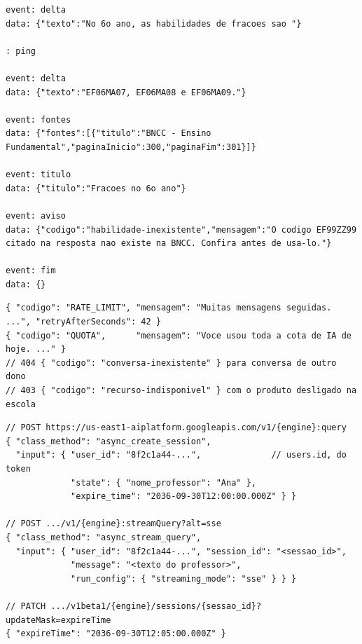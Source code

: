 \begin{lstlisting}[language=bashunoo, caption={A resposta: \cd{text/event-stream} (um turno com fonte, título e aviso)}]
event: delta
data: {"texto":"No 6o ano, as habilidades de fracoes sao "}

: ping

event: delta
data: {"texto":"EF06MA07, EF06MA08 e EF06MA09."}

event: fontes
data: {"fontes":[{"titulo":"BNCC - Ensino Fundamental","paginaInicio":300,"paginaFim":301}]}

event: titulo
data: {"titulo":"Fracoes no 6o ano"}

event: aviso
data: {"codigo":"habilidade-inexistente","mensagem":"O codigo EF99ZZ99 citado na resposta nao existe na BNCC. Confira antes de usa-lo."}

event: fim
data: {}
\end{lstlisting}

\begin{lstlisting}[language=jsonunoo, caption={Recusa ANTES do \emph{stream} --- 429 em JSON}]
{ "codigo": "RATE_LIMIT", "mensagem": "Muitas mensagens seguidas. ...", "retryAfterSeconds": 42 }
{ "codigo": "QUOTA",      "mensagem": "Voce usou toda a cota de IA de hoje. ..." }
// 404 { "codigo": "conversa-inexistente" } para conversa de outro dono
// 403 { "codigo": "recurso-indisponivel" } com o produto desligado na escola
\end{lstlisting}

\begin{lstlisting}[language=jsonunoo, caption={A api \seta{} o Agent Engine: \cd{:query} e \cd{:streamQuery?alt=sse}}]
// POST https://us-east1-aiplatform.googleapis.com/v1/{engine}:query
{ "class_method": "async_create_session",
  "input": { "user_id": "8f2c1a44-...",              // users.id, do token
             "state": { "nome_professor": "Ana" },
             "expire_time": "2036-09-30T12:00:00.000Z" } }

// POST .../v1/{engine}:streamQuery?alt=sse
{ "class_method": "async_stream_query",
  "input": { "user_id": "8f2c1a44-...", "session_id": "<sessao_id>",
             "message": "<texto do professor>",
             "run_config": { "streaming_mode": "sse" } } }

// PATCH .../v1beta1/{engine}/sessions/{sessao_id}?updateMask=expireTime
{ "expireTime": "2036-09-30T12:05:00.000Z" }
\end{lstlisting}

